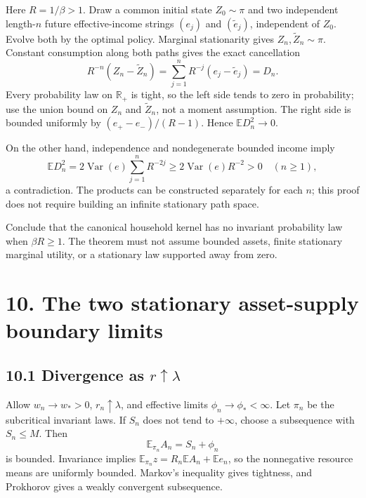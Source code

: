 \documentclass[
  11pt,
]{article}
\begin{document}
Here \(R=1/\beta>1\). Draw a common initial state \(Z_0\sim\pi\) and two
independent length-\(n\) future effective-income strings \((e_j)\) and
\((\widetilde e_j)\), independent of \(Z_0\). Evolve both by the optimal
policy. Marginal stationarity gives \(Z_n,\widetilde Z_n\sim\pi\).
Constant consumption along both paths gives the exact cancellation \[
R^{-n}(Z_n-\widetilde Z_n)
=\sum_{j=1}^nR^{-j}(e_j-\widetilde e_j)=D_n.
\] Every probability law on \(\mathbb R_+\) is tight, so the left side
tends to zero in probability; use the union bound on \(Z_n\) and
\(\widetilde Z_n\), not a moment assumption. The right side is bounded
uniformly by \((e_+-e_-)/(R-1)\). Hence \(\mathbb E D_n^2\to0\).

On the other hand, independence and nondegenerate bounded income imply
\[
\mathbb E D_n^2=2\operatorname{Var}(e)\sum_{j=1}^nR^{-2j}
\geq2\operatorname{Var}(e)R^{-2}>0\quad(n\geq1),
\] a contradiction. The products can be constructed separately for each
\(n\); this proof does not require building an infinite stationary path
space.

Conclude that the canonical household kernel has no invariant
probability law when \(\beta R\geq1\). The theorem must not assume
bounded assets, finite stationary marginal utility, or a stationary law
supported away from zero.

\section{10. The two stationary asset-supply boundary
limits}\label{the-two-stationary-asset-supply-boundary-limits}

\subsection{\texorpdfstring{10.1 Divergence as
\(r\uparrow\lambda\)}{10.1 Divergence as r\textbackslash uparrow\textbackslash lambda}}\label{divergence-as-ruparrowlambda}

Allow \(w_n\to w_*>0\), \(r_n\uparrow\lambda\), and effective limits
\(\phi_n\to\phi_*<\infty\). Let \(\pi_n\) be the subcritical invariant
laws. If \(S_n\) does not tend to \(+\infty\), choose a subsequence with
\(S_n\leq M\). Then \[
\mathbb E_{\pi_n}A_n=S_n+\phi_n
\] is bounded. Invariance implies
\(\mathbb E_{\pi_n}z=R_n\mathbb E A_n+\mathbb E e_n\), so the
nonnegative resource means are uniformly bounded. Markov's inequality
gives tightness, and Prokhorov gives a weakly convergent subsequence.
\end{document}
